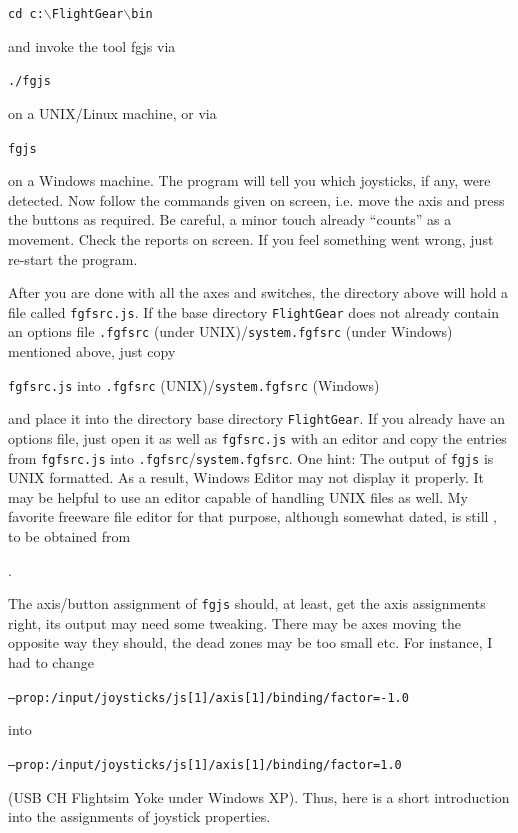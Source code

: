 \noindent
\texttt{cd c:$\backslash$FlightGear$\backslash$bin}

and invoke the tool fgjs via

\noindent
\texttt{./fgjs}

on a UNIX/Linux machine, or via

\noindent
\texttt{fgjs}

on a Windows machine. The program will tell you which joysticks, if any, were detected. Now follow the commands given on screen, i.e. move the axis and press the buttons as required. Be careful, a minor touch already ``counts'' as a movement. Check the reports on screen. If you feel something went wrong, just re-start the program.

After you are done with all the axes and switches, the directory above will hold a file called \texttt{fgfsrc.js}. If the \FlightGear{} base directory \texttt{FlightGear} does not already contain an options file \texttt{.fgfsrc} (under UNIX)/\texttt{system.fgfsrc} (under Windows) mentioned above, just copy
\medskip

\noindent
 \texttt{fgfsrc.js} into \texttt{.fgfsrc} (UNIX)/\texttt{system.fgfsrc} (Windows)
 \medskip

\noindent
and place it into the directory \FlightGear{} base directory \texttt{FlightGear}. If you already have an options file, just open it as well as \texttt{fgfsrc.js} with an editor and copy the entries from \texttt{fgfsrc.js} into \texttt{.fgfsrc}/\texttt{system.fgfsrc}. One hint: The output of \texttt{fgjs} is UNIX formatted. As a result, Windows Editor may not display it properly. It may be helpful to use an editor capable of handling UNIX files as well. My favorite freeware file editor for that purpose, although somewhat dated, is still , to be obtained from

.

The axis/button assignment of \texttt{fgjs} should, at least, get the axis assignments right, its output may need some tweaking. There may be axes moving the opposite way they should, the dead zones may be too small etc. For instance, I had to change

\texttt{--prop:/input/joysticks/js[1]/axis[1]/binding/factor=-1.0}

into

\texttt{--prop:/input/joysticks/js[1]/axis[1]/binding/factor=1.0}

(USB CH Flightsim Yoke under Windows XP). Thus, here is a short introduction into the assignments of joystick properties.

